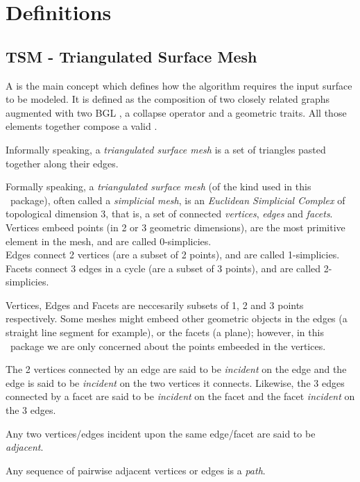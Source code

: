 \section{Definitions}

\subsection{TSM - Triangulated Surface Mesh}

A  is the main concept which defines how the algorithm requires the input surface to be modeled. It is defined as the composition of two closely related graphs augmented with two BGL , a collapse operator and a geometric traits. All those elements together compose a valid .

Informally speaking, a {\em triangulated surface mesh} is a set of triangles pasted together along their edges.

Formally speaking, a {\em triangulated surface mesh} (of the kind used in this \cgal\ package), often called a {\em simplicial mesh}, is an {\em Euclidean Simplicial Complex} of topological dimension 3, that is, a set of connected {\em vertices}, {\em edges} and {\em facets}.\\
Vertices embeed points (in 2 or 3 geometric dimensions), are the most primitive element in the mesh, and are called 0-simplicies.\\
Edges connect 2 vertices (are a subset of 2 points), and are called 1-simplicies.\\
Facets connect 3 edges in a cycle (are a subset of 3 points), and are called 2-simplicies.

Vertices, Edges and Facets are neccesarily subsets of 1, 2 and 3 points respectively. Some meshes might embeed other geometric objects in the edges (a straight line segment for example), or the facets (a plane); however, in this \cgal\ package we are only concerned about the points embeeded in the vertices.

The 2 vertices connected by an edge are said to be {\em incident} on the edge and the edge is said to be {\em incident} on the two vertices it connects. Likewise, the 3 edges connected by a facet are said to be {\em incident} on the facet and the facet {\em incident} on the 3 edges.

Any two vertices/edges incident upon the same edge/facet are said to be {\em adjacent}.

Any sequence of pairwise adjacent vertices or edges is a {\em path}.

